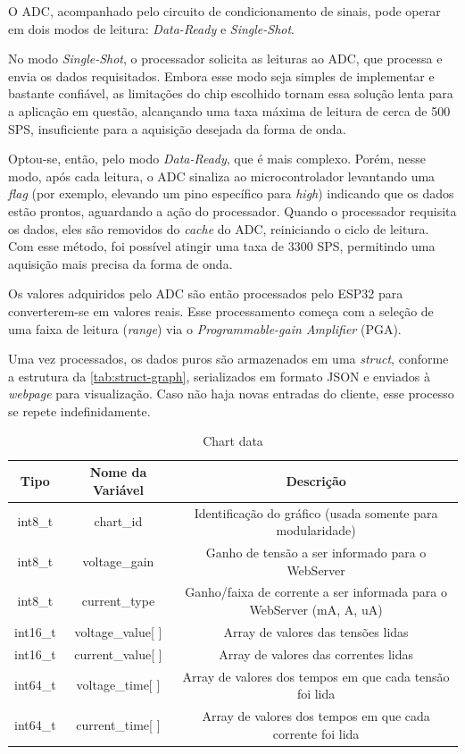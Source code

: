 O \gls{ADC}, acompanhado pelo circuito de condicionamento de sinais, pode operar em dois modos de leitura: \textit{Data-Ready} e \textit{Single-Shot}.

No modo \textit{Single-Shot}, o processador solicita as leituras ao \gls{ADC}, que processa e envia os dados requisitados. Embora esse modo seja simples de implementar e bastante confiável, as limitações do chip escolhido tornam essa solução lenta para a aplicação em questão, alcançando uma taxa máxima de leitura de cerca de 500 \gls{SPS}, insuficiente para a aquisição desejada da forma de onda.

Optou-se, então, pelo modo \textit{Data-Ready}, que é mais complexo. Porém, nesse modo, após cada leitura, o \gls{ADC} sinaliza ao microcontrolador levantando uma \textit{flag} (por exemplo, elevando um pino específico para \textit{high}) indicando que os dados estão prontos, aguardando a ação do processador. Quando o processador requisita os dados, eles são removidos do \textit{cache} do \gls{ADC}, reiniciando o ciclo de leitura. Com esse método, foi possível atingir uma taxa de 3300 \gls{SPS}, permitindo uma aquisição mais precisa da forma de onda.

Os valores adquiridos pelo \gls{ADC} são então processados pelo ESP32 para converterem-se em valores reais. Esse processamento começa com a seleção de uma faixa de leitura (\textit{range}) via o \textit{Programmable-gain Amplifier} (\gls{PGA}).

Uma vez processados, os dados puros são armazenados em uma \textit{struct}, conforme a estrutura da \autoref{tab:struct-graph}, serializados em formato JSON e enviados à \textit{webpage} para visualização. Caso não haja novas entradas do cliente, esse processo se repete indefinidamente.

\begin{table}[h!]
\centering
\caption{Chart data}
\begin{tabular}{ c c c }
    \hline
    \textbf{Tipo} & \textbf{Nome da Variável} & \textbf{Descrição} \\ \hline
    int8\_t & chart\_id & Identificação do gráfico (usada somente para modularidade) \\ \hline
    int8\_t & voltage\_gain & Ganho de tensão a ser informado para o WebServer \\ \hline
    int8\_t & current\_type & Ganho/faixa de corrente a ser informada para o WebServer (mA, A, uA) \\ \hline
    int16\_t & voltage\_value[ ] & Array de valores das tensões lidas \\ \hline
    int16\_t & current\_value[ ] & Array de valores das correntes lidas \\ \hline
    int64\_t & voltage\_time[ ] & Array de valores dos tempos em que cada tensão foi lida \\ \hline
    int64\_t & current\_time[ ] & Array de valores dos tempos em que cada corrente foi lida \\ \hline
\end{tabular}
\label{tab:struct-graph}
\fonte{}
\end{table}

